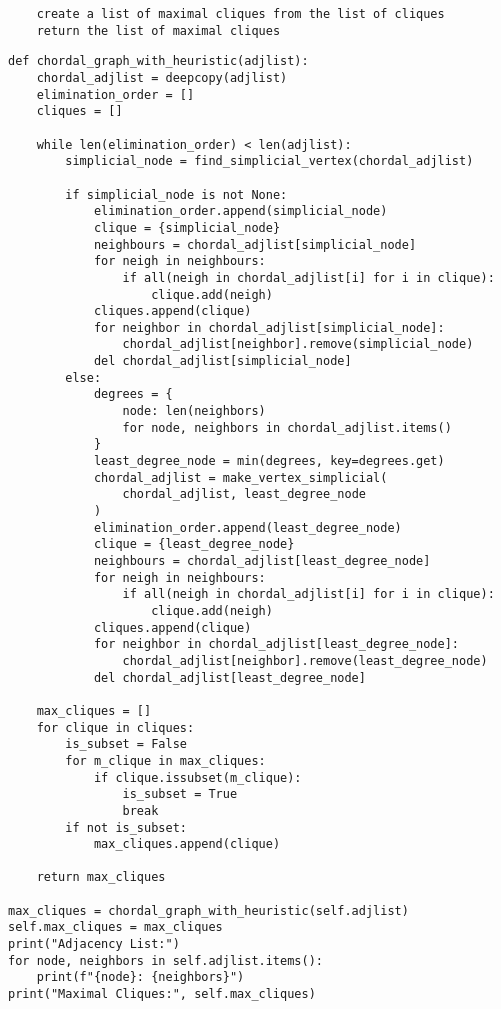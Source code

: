 \documentclass[12pt]{article}
\begin{document}
\begin{enumerate}
\begin{verbatim}
    create a list of maximal cliques from the list of cliques
    return the list of maximal cliques

\end{verbatim}
 

\end{enumerate}


\begin{verbatim}
def chordal_graph_with_heuristic(adjlist):
    chordal_adjlist = deepcopy(adjlist)
    elimination_order = []
    cliques = []

    while len(elimination_order) < len(adjlist):
        simplicial_node = find_simplicial_vertex(chordal_adjlist)

        if simplicial_node is not None:
            elimination_order.append(simplicial_node)
            clique = {simplicial_node}
            neighbours = chordal_adjlist[simplicial_node]
            for neigh in neighbours:
                if all(neigh in chordal_adjlist[i] for i in clique):
                    clique.add(neigh)
            cliques.append(clique)
            for neighbor in chordal_adjlist[simplicial_node]:
                chordal_adjlist[neighbor].remove(simplicial_node)
            del chordal_adjlist[simplicial_node]
        else:
            degrees = {
                node: len(neighbors)
                for node, neighbors in chordal_adjlist.items()
            }
            least_degree_node = min(degrees, key=degrees.get)
            chordal_adjlist = make_vertex_simplicial(
                chordal_adjlist, least_degree_node
            )
            elimination_order.append(least_degree_node)
            clique = {least_degree_node}
            neighbours = chordal_adjlist[least_degree_node]
            for neigh in neighbours:
                if all(neigh in chordal_adjlist[i] for i in clique):
                    clique.add(neigh)
            cliques.append(clique)
            for neighbor in chordal_adjlist[least_degree_node]:
                chordal_adjlist[neighbor].remove(least_degree_node)
            del chordal_adjlist[least_degree_node]

    max_cliques = []
    for clique in cliques:
        is_subset = False
        for m_clique in max_cliques:
            if clique.issubset(m_clique):
                is_subset = True
                break
        if not is_subset:
            max_cliques.append(clique)

    return max_cliques

max_cliques = chordal_graph_with_heuristic(self.adjlist)
self.max_cliques = max_cliques
print("Adjacency List:")
for node, neighbors in self.adjlist.items():
    print(f"{node}: {neighbors}")
print("Maximal Cliques:", self.max_cliques)
\end{verbatim}
\end{document}
